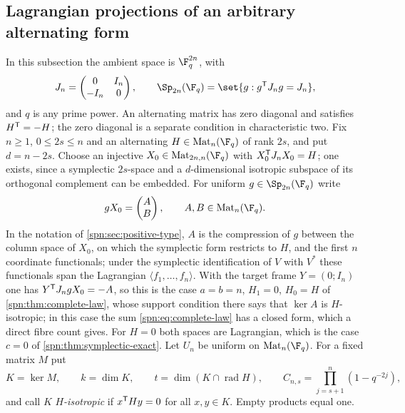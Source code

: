 \subsection{Lagrangian projections of an arbitrary alternating form}\label{spn:sec:lagrangian}

In this subsection the ambient space is $\F_q^{2n}$, with
\[
 J_n=\begin{pmatrix}0&I_n\\-I_n&0\end{pmatrix},\qquad
 \Sp_{2n}(\F_q)=\set{g:g^{\spnT}J_ng=J_n},
\]
and $q$ is any prime power. An alternating matrix has zero diagonal and satisfies
$H^{\mathsf{T}}=-H$; the zero diagonal is a separate condition in characteristic two. Fix $n\ge1$,
$0\le2s\le n$ and an alternating $H\in\spnMat_n(\F_q)$ of rank $2s$, and put $d=n-2s$. Choose
an injective $X_0\in\spnMat_{2n,n}(\F_q)$ with $X_0^{\mathsf{T}}J_nX_0=H$; one exists, since a
symplectic $2s$-space and a $d$-dimensional isotropic subspace of its orthogonal complement
can be embedded. For uniform $g\in\Sp_{2n}(\F_q)$ write
\begin{equation}\label{spn:eq:lagrangian-model}
 gX_0=\begin{pmatrix}A\\B\end{pmatrix},\qquad A,B\in\spnMat_n(\F_q).
\end{equation}
In the notation of \cref{spn:sec:positive-type}, $A$ is the compression of $g$ between the
column space of $X_0$, on which the symplectic form restricts to $H$, and the first $n$
coordinate functionals; under the symplectic identification of $V$ with $V^*$ these functionals
span the Lagrangian $\langle f_1,\dots,f_n\rangle$. With the target frame $Y=(0;I_n)$ one has
$Y^{\mathsf{T}}J_ngX_0=-A$, so this is the case $a=b=n$, $H_1=0$, $H_0=H$ of
\cref{spn:thm:complete-law}, whose support condition there says that $\ker A$ is
$H$-isotropic; in this case the sum \eqref{spn:eq:complete-law} has a closed form, which a
direct fibre count gives. For $H=0$ both spaces are Lagrangian, which is the case $c=0$ of
\cref{spn:thm:symplectic-exact}. Let $U_n$ be uniform on
$\spnMat_n(\F_q)$. For a fixed matrix $M$ put
\[
 K=\ker M,\qquad k=\dim K,\qquad t=\dim(K\cap\operatorname{rad}H),\qquad
 C_{n,s}=\prod_{j=s+1}^n(1-q^{-2j}),
\]
and call $K$ \emph{$H$-isotropic} if $x^{\mathsf{T}}Hy=0$ for all $x,y\in K$. Empty products equal
one.

